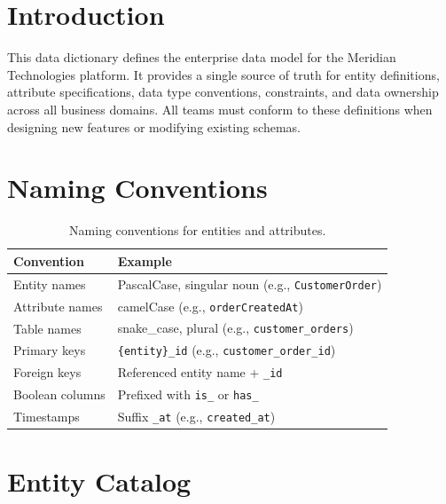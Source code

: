 \documentclass[
    language=english,
    doctype=data-dictionary,
    institution=none,
]{../../omnilatex}
\begin{document}
\maketitle

\section{Introduction}

This data dictionary defines the enterprise data model for the Meridian
Technologies platform. It provides a single source of truth for entity
definitions, attribute specifications, data type conventions, constraints,
and data ownership across all business domains. All teams must conform to
these definitions when designing new features or modifying existing schemas.

\section{Naming Conventions}

\begin{table}[h]
    \centering
    \begin{tabular}{ll}
        \toprule
        \textbf{Convention} & \textbf{Example} \\
        \midrule
        Entity names & PascalCase, singular noun (e.g., \texttt{CustomerOrder}) \\
        Attribute names & camelCase (e.g., \texttt{orderCreatedAt}) \\
        Table names & snake\_case, plural (e.g., \texttt{customer\_orders}) \\
        Primary keys & \texttt{\{entity\}\_id} (e.g., \texttt{customer\_order\_id}) \\
        Foreign keys & Referenced entity name + \texttt{\_id} \\
        Boolean columns & Prefixed with \texttt{is\_} or \texttt{has\_} \\
        Timestamps & Suffix \texttt{\_at} (e.g., \texttt{created\_at}) \\
        \bottomrule
    \end{tabular}
    \caption{Naming conventions for entities and attributes.}
\end{table}

\section{Entity Catalog}
\end{document}
